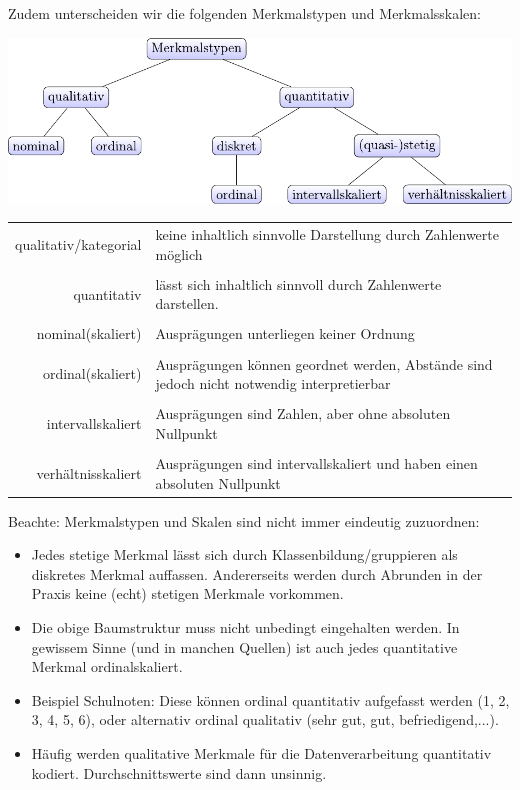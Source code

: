 Zudem unterscheiden wir die folgenden Merkmalstypen und Merkmalsskalen:

\begin{center}
  \includegraphics{img/merkmalstypen}
\end{center}

\begin{center}
  \begin{tabular}{r|p{12cm}}
    qualitativ/kategorial & keine inhaltlich sinnvolle Darstellung durch
                            Zahlenwerte möglich \\
    \\
    quantitativ & lässt sich inhaltlich sinnvoll durch Zahlenwerte
                  darstellen. \\
    \\
    nominal(skaliert) & Ausprägungen unterliegen keiner Ordnung \\
    \\
    ordinal(skaliert) & Ausprägungen können geordnet werden, Abstände
                        sind jedoch nicht notwendig interpretierbar \\
    \\
    intervallskaliert & Ausprägungen sind Zahlen, aber ohne absoluten
                        Nullpunkt \\
    \\
    verhältnisskaliert & Ausprägungen sind intervallskaliert und haben einen
                         absoluten Nullpunkt
  \end{tabular}
\end{center}

Beachte: Merkmalstypen und Skalen sind nicht immer eindeutig zuzuordnen:
\begin{itemize}
\item Jedes stetige Merkmal lässt sich durch Klassenbildung/gruppieren als
  diskretes Merkmal auffassen. Andererseits werden durch Abrunden in der Praxis
  keine (echt) stetigen Merkmale vorkommen.
\item Die obige Baumstruktur muss nicht unbedingt eingehalten werden. In
  gewissem Sinne (und in manchen Quellen) ist auch jedes quantitative Merkmal
  ordinalskaliert.
\item Beispiel Schulnoten: Diese können ordinal quantitativ aufgefasst werden
  (1, 2, 3, 4, 5, 6), oder alternativ ordinal qualitativ (sehr gut, gut,
  befriedigend,...). 
\item Häufig werden qualitative Merkmale für die Datenverarbeitung quantitativ
  kodiert. Durchschnittswerte sind dann unsinnig.
\end{itemize}

